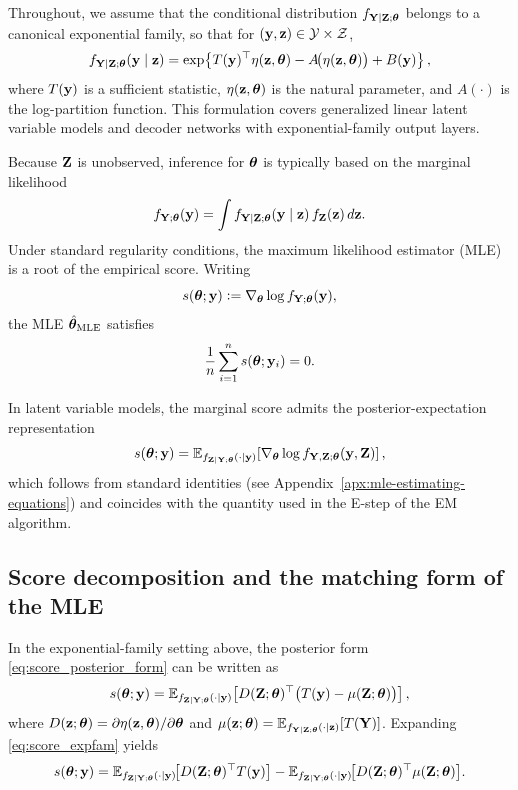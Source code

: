 \documentclass[twoside,11pt]{article}
\begin{document}
Throughout, we assume that the conditional distribution $f_{{\bf Y}\mid{\bf Z};{\bm{\theta}}}$ belongs to
a canonical exponential family, so that for $({\bf y},{\bf z})\in\mathcal Y\times\mathcal Z$,
\[
f_{{\bf Y}\mid{\bf Z};{\bm{\theta}}}({\bf y}\mid{\bf z})
=
\exp\!\left\{
T({\bf y})^\top \eta({\bf z},{\bm{\theta}})
-
A\!\bigl(\eta({\bf z},{\bm{\theta}})\bigr)
+
B({\bf y})
\right\},
\]
where $T({\bf y})$ is a sufficient statistic, $\eta({\bf z},{\bm{\theta}})$ is the natural parameter, and
$A(\cdot)$ is the log-partition function. This formulation covers generalized linear
latent variable models and decoder networks with exponential-family output layers.

Because ${\bf Z}$ is unobserved, inference for ${\bm{\theta}}$ is typically based on the marginal likelihood
\[
f_{{\bf Y};{\bm{\theta}}}({\bf y})=\int f_{{\bf Y}\mid{\bf Z};{\bm{\theta}}}({\bf y}\mid{\bf z})\,f_{\bf Z}({\bf z})\,d{\bf z}.
\]
Under standard regularity conditions, the maximum likelihood estimator (MLE) is a root of
the empirical score. Writing
\[
s({\bm{\theta}};{\bf y})\vcentcolon=\nabla_{\bm{\theta}} \log f_{{\bf Y};{\bm{\theta}}}({\bf y}),
\]
the MLE $\hat{{\bm{\theta}}}_{\mathrm{MLE}}$ satisfies
\begin{equation}
\frac{1}{n}\sum_{i=1}^n s({\bm{\theta}};{\bf y}_i)=0.
\label{eq:mle_score_eq}
\end{equation}

In latent variable models, the marginal score admits the posterior-expectation representation
\begin{equation}
s({\bm{\theta}};{\bf y})
=
\mathbb{E}_{f_{{\bf Z}\mid{\bf Y};{\bm{\theta}}}(\cdot\mid {\bf y})}
\!\left[
\nabla_{\bm{\theta}} \log f_{{\bf Y},{\bf Z};{\bm{\theta}}}({\bf y},{\bf Z})
\right],
\label{eq:score_posterior_form}
\end{equation}
which follows from standard identities (see Appendix~\ref{apx:mle-estimating-equations}) and
coincides with the quantity used in the E-step of the EM algorithm.

\subsection{Score decomposition and the matching form of the MLE}

In the exponential-family setting above, the posterior form \eqref{eq:score_posterior_form}
can be written as
\begin{equation}
s({\bm{\theta}};{\bf y})
=
\mathbb{E}_{f_{{\bf Z}\mid{\bf Y};{\bm{\theta}}}(\cdot\mid {\bf y})}
\!\left[
D({\bf Z};{\bm{\theta}})^\top\bigl(T({\bf y})-\mu({\bf Z};{\bm{\theta}})\bigr)
\right],
\label{eq:score_expfam}
\end{equation}
where $D({\bf z};{\bm{\theta}})=\partial\eta({\bf z},{\bm{\theta}})/\partial{\bm{\theta}}$ and
$\mu({\bf z};{\bm{\theta}})=\mathbb{E}_{f_{{\bf Y}\mid{\bf Z};{\bm{\theta}}}(\cdot\mid {\bf z})}[T({\bf Y})]$.
Expanding \eqref{eq:score_expfam} yields
\begin{equation}
s({\bm{\theta}};{\bf y})
=
\mathbb{E}_{f_{{\bf Z}\mid{\bf Y};{\bm{\theta}}}(\cdot\mid {\bf y})}\!\big[D({\bf Z};{\bm{\theta}})^\top T({\bf y})\big]
-
\mathbb{E}_{f_{{\bf Z}\mid{\bf Y};{\bm{\theta}}}(\cdot\mid {\bf y})}\!\big[D({\bf Z};{\bm{\theta}})^\top \mu({\bf Z};{\bm{\theta}})\big].
\label{eq:score_two_terms}
\end{equation}
\end{document}
